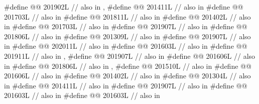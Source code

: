 \begin{codeblock}
#define @@                       201902L // also in , 
#define @@                            201411L // also in 
#define @@                      201703L // also in 
#define @@             201811L // also in 
#define @@                          201402L // also in 
#define @@                      201703L // also in 
#define @@              201907L // also in 
#define @@            201806L // also in 
#define @@                   201309L // also in 
#define @@       201907L // also in 
#define @@                    202011L // also in 
#define @@                      201603L // also in 
#define @@                           201911L // also in , 
#define @@                             201907L // also in 
#define @@                           201606L // also in 
#define @@           201806L // also in , 
#define @@                    201510L // also in 
#define @@                   201606L // also in 
#define @@             201402L // also in 
#define @@                       201304L // also in 
#define @@                   201411L // also in 
#define @@                    201907L // also in 
#define @@            201603L // also in 
#define @@                   201603L // also in 

\end{codeblock}
